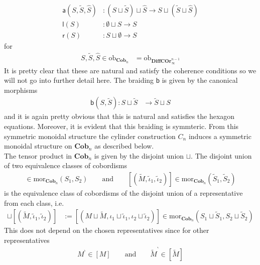 \begin{align*}
  \mathsf{a}(S,\tilde{S},\hat{S})
  &\colon
  \left(
    S
    \sqcup
    \tilde{S}
  \right)
  \sqcup
  \hat{S}
  \to
  S
  \sqcup
  \left(
    \tilde{S}
    \sqcup
    \hat{S}
  \right)
  \\
  \mathsf{l}(S)
  &\colon
  \emptyset
  \sqcup
  S
  \to
  S
  \\
  \mathsf{r}(S)
  &\colon
  S
  \sqcup
  \emptyset
  \to
  S
\end{align*}
for
\begin{align*}
  S
  ,
  \tilde{S}
  ,
  \hat{S}
  \in
  \mathrm{ob}_{\mathbf{Cob}_{n}}
  &=
  \mathrm{ob}_{\mathbf{DiffCOr}_{\infty}^{n - 1}}
\end{align*}
It is pretty clear that these are natural and satisfy the coherence conditions so we will not go into further detail here. The braiding $\mathsf{b}$ is given by the canonical morphisms
\begin{align*}
  \mathsf{b}(S,\tilde{S})
  \colon
  S
  \sqcup
  \tilde{S}
  &\to
  \tilde{S}
  \sqcup
  S
\end{align*}
and it is again pretty obvious that this is natural and satisfies the hexagon equations. Moreover, it is evident that this braiding is symmteric. From this symmetric monoidal structure the cylinder construction $C_{n}$ induces a symmetric monoidal structure on $\mathbf{Cob}_{n}$ as described below.
\\
The tensor product in $\mathbf{Cob}_{n}$ is given by the disjoint union $\sqcup$. The disjoint union of two equivalence classes of cobordisms
\begin{align*}
  [(M,\iota_{1},\iota_{2})]
  \in
  \mathrm{mor}_{\mathbf{Cob}_{n}}(S_{1},S_{2})
  \qquad
  \text{and}
  \qquad
  [(\tilde{M},\tilde{\iota}_{1},\tilde{\iota}_{2})]
  \in
  \mathrm{mor}_{\mathbf{Cob}_{n}}(\tilde{S}_{1},\tilde{S}_{2})
\end{align*}
is the equivalence class of cobordisms of the disjoint union of a representative from each class, i.e.
\begin{align*}
  [(M,\iota_{1},\iota_{2})] \sqcup [(\tilde{M},\tilde{\iota}_{1},\tilde{\iota}_{2})]
  &:=
  [(M \sqcup \tilde{M},\iota_{1} \sqcup \tilde{\iota}_{1},\iota_{2} \sqcup \tilde{\iota}_{2})]
  \in
  \mathrm{mor}_{\mathbf{Cob}_{n}}(S_{1} \sqcup \tilde{S}_{1},S_{2} \sqcup \tilde{S}_{2})
\end{align*}
This does not depend on the chosen representatives since for other representatives
\begin{align*}
  M^{\backprime}
  \in
  [M]
  \qquad
  \text{and}
  \qquad
  \tilde{M}^{\backprime}
  \in
  [\tilde{M}]
\end{align*}
